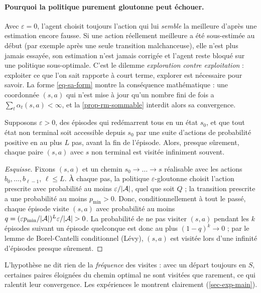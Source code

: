 \paragraph{Pourquoi la politique purement gloutonne peut échouer.} Avec $\varepsilon=0$, l'agent choisit toujours l'action qui lui \emph{semble} la meilleure d'après une estimation encore fausse. Si une action réellement meilleure a été sous-estimée au début (par exemple après une seule transition malchanceuse), elle n'est plus jamais essayée, son estimation n'est jamais corrigée et l'agent reste bloqué sur une politique sous-optimale. C'est le dilemme \emph{exploration contre exploitation} : exploiter ce que l'on sait rapporte à court terme, explorer est nécessaire pour savoir. La forme \eqref{eq-sa-form} montre la conséquence mathématique : une coordonnée $(s,a)$ qui n'est mise à jour qu'un nombre fini de fois a $\sum_t\alpha_t(s,a)<\infty$, et la \cref{prop-rm-sommable} interdit alors sa convergence.

\begin{proposition}\label{prop-visites}
Supposons $\varepsilon>0$, des épisodes qui redémarrent tous en un état $s_0$, et que tout état non terminal soit accessible depuis $s_0$ par une suite d'actions de probabilité positive en au plus $L$ pas, avant la fin de l'épisode. Alors, presque sûrement, chaque paire $(s,a)$ avec $s$ non terminal est visitée infiniment souvent.
\end{proposition}
\begin{proof}[Esquisse]
Fixons $(s,a)$ et un chemin $s_0\to\dots\to s$ réalisable avec les actions $b_0,\dots,b_{\ell-1}$, $\ell\le L$. À chaque pas, la politique $\varepsilon$-gloutonne choisit l'action prescrite avec probabilité au moins $\varepsilon/|\mathcal{A}|$, quel que soit $Q$ ; la transition prescrite a une probabilité au moins $p_{\min}>0$. Donc, conditionnellement à tout le passé, chaque épisode visite $(s,a)$ avec probabilité au moins $q=(\varepsilon p_{\min}/|\cA|)^{L}\varepsilon/|\cA|>0$. La probabilité de ne pas visiter $(s,a)$ pendant les $k$ épisodes suivant un épisode quelconque est donc au plus $(1-q)^k\to0$ ; par le lemme de Borel-Cantelli conditionnel (Lévy), $(s,a)$ est visitée lors d'une infinité d'épisodes presque sûrement.
\end{proof}

L'hypothèse ne dit rien de la \emph{fréquence} des visites : avec un départ toujours en $S$, certaines paires éloignées du chemin optimal ne sont visitées que rarement, ce qui ralentit leur convergence. Les expériences le montrent clairement (\cref{sec-exp-main}).

